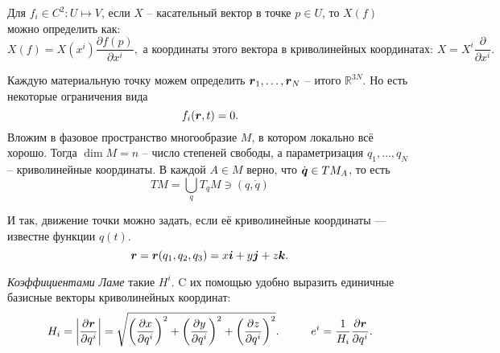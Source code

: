 \begin{to_lem}[Из матана]
	Для $f_i \in  C^2 \colon U \mapsto V$, если $X$ -- касательный вектор в точке $p \in U$, то $X(f)$ можно определить как:
	\begin{equation*}
		X(f) = X(x^i) \frac{\partial f(p)}{\partial x^i}, \text{ а координаты этого вектора в криволинейных координатах: } X = X^i \frac{\partial}{\partial x^i}.
	\end{equation*}
\end{to_lem}

Каждую материальную точку можем определить $\mbox{\boldmath $r$}_1, \ldots, \mbox{\boldmath $r$}_N$ -- итого $\mathbb{R}^{3N}$. Но есть некоторые ограничения вида
\begin{equation*}
    f_i (\mbox{\boldmath $r$}, t) = 0.
\end{equation*}
Вложим в фазовое пространство многообразие $M$, в котором локально всё хорошо. Тогда
$\dim M = n$ -- число степеней свободы, а параметризация $q_1, \ldots, q_N$ -- криволинейные координаты. В каждой $A \in M$ верно, что $\dot{\mbox{\boldmath $q$}} \in TM_A$, то есть
\begin{equation*}
    TM = \bigcup_q T_qM \ni (q, \dot{q})
\end{equation*}

И так, движение точки можно задать, если её криволинейные координаты --- известне функции $q(t)$.
\begin{equation*}
	\mbox{\boldmath $r$} = \mbox{\boldmath $r$}(q_1, q_2, q_3) = x \mbox{\boldmath $i$} + y \mbox{\boldmath $j$} + z \mbox{\boldmath $k$}.
\end{equation*}

\begin{to_def}
	\textit{Коэффициентами Ламе} такие $H^i$. C их помощью удобно выразить единичные базисные векторы криволинейных координат: 
	\begin{equation*}
		H_i = \left|\frac{\partial \mbox{\boldmath $r$}}{\partial q^i} \right| = \sqrt{\left(\frac{\partial x}{\partial q^i}\right)^2 + \left(\frac{\partial y}{\partial q^i}\right)^2 + \left(\frac{\partial z}{\partial q^i}\right)^2}.
		\hspace*{1 cm}
		e^i = \frac{1}{H_i} \frac{\partial \mbox{\boldmath $r$}}{\partial q^i}.
	\end{equation*}
\end{to_def}

